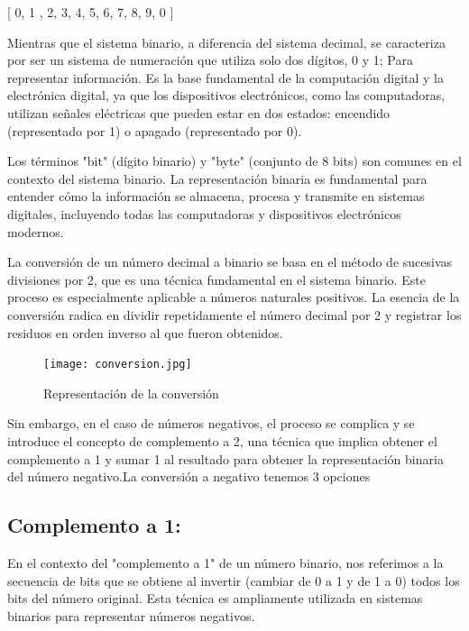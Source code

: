 \documentclass{IEEEcsmag}
\begin{document}
[ 0, 1 , 2, 3, 4, 5, 6, 7, 8, 9, 0 ] 
\newline


Mientras que el sistema binario, a diferencia del sistema decimal, se caracteriza por ser un sistema de numeración que utiliza solo dos dígitos, 0 y 1; Para representar información. Es la base fundamental de la computación digital y la electrónica digital, ya que los dispositivos electrónicos, como las computadoras, utilizan señales eléctricas que pueden estar en dos estados: encendido (representado por 1) o apagado (representado por 0).
\newline

Los términos "bit" (dígito binario) y "byte" (conjunto de 8 bits) son comunes en el contexto del sistema binario. La representación binaria es fundamental para entender cómo la información se almacena, procesa y transmite en sistemas digitales, incluyendo todas las computadoras y dispositivos electrónicos modernos.
\newline 

La conversión de un número decimal a binario se basa en el método de sucesivas divisiones por 2, que es una técnica fundamental en el sistema binario. Este proceso es especialmente aplicable a números naturales positivos. La esencia de la conversión radica en dividir repetidamente el número decimal por 2 y registrar los residuos en orden inverso al que fueron obtenidos.

\begin{figure} 
    \centering
    \texttt{[image: conversion.jpg]}
    \caption{Representación de la conversión}
    \label{fig: Conversion a Binario}
\end{figure}

Sin embargo, en el caso de números negativos, el proceso se complica y se introduce el concepto de complemento a 2, una técnica que implica obtener el complemento a 1 y sumar 1 al resultado para obtener la representación binaria del número negativo.La conversión a negativo tenemos 3 opciones 

\subsection{Complemento a 1:}
En el contexto del "complemento a 1" de un número binario, nos referimos a la secuencia de bits que se obtiene al invertir (cambiar de 0 a 1 y de 1 a 0) todos los bits del número original. Esta técnica es ampliamente utilizada en sistemas binarios para representar números negativos.
\newline
\end{document}
